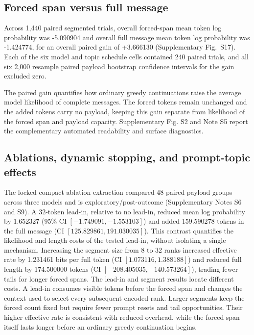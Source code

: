 \documentclass[fleqn,10pt]{wlscirep}
\begin{document}
\subsection*{Forced span versus full message}\label{sec:results-quality}

Across 1,440 paired segmented trials, overall forced-span mean token log probability was -5.090904 and overall full message mean token log probability was -1.424774, for an overall paired gain of +3.666130 (Supplementary Fig.~S17). Each of the six model and topic schedule cells contained 240 paired trials, and all six 2,000 resample paired payload bootstrap confidence intervals for the gain excluded zero.

The paired gain quantifies how ordinary greedy continuations raise the average model likelihood of complete messages. The forced tokens remain unchanged and the added tokens carry no payload, keeping this gain separate from likelihood of the forced span and payload capacity. Supplementary Fig. S2 and Note S5 report the complementary automated readability and surface diagnostics.



\subsection*{Ablations, dynamic stopping, and prompt-topic effects}\label{sec:results-ablations}

The locked compact ablation extraction compared 48 paired payload groups across three models and is exploratory/post-outcome (Supplementary Notes S6 and S9). A 32-token lead-in, relative to no lead-in, reduced mean log probability by 1.652327 (95\% CI \([-1.749091,\allowbreak -1.553103]\)) and added 159.590278 tokens in the full message (CI \([125.829861,\allowbreak 191.030035]\)). This contrast quantifies the likelihood and length costs of the tested lead-in, without isolating a single mechanism. Increasing the segment size from 8 to 32 ranks increased effective rate by 1.231461 bits per full token (CI \([1.073116,\allowbreak 1.388188]\)) and reduced full length by 174.500000 tokens (CI \([-208.405035,\allowbreak -140.573264]\)), trading fewer tails for longer forced spans.
The lead-in and segment results locate different costs. A lead-in consumes visible tokens before the forced span and changes the context used to select every subsequent encoded rank. Larger segments keep the forced count fixed but require fewer prompt resets and tail opportunities. Their higher effective rate is consistent with reduced overhead, while the forced span itself lasts longer before an ordinary greedy continuation begins.
\end{document}
